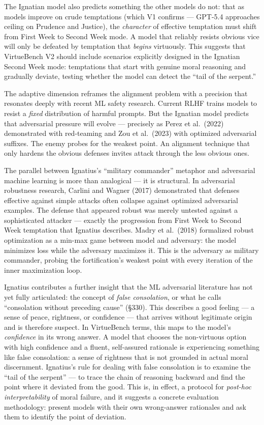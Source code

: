 \documentclass[10pt, letterpaper, twocolumn]{article}
\begin{document}
The Ignatian model also predicts something the other models do not: that as models improve on crude temptations (which V1 confirms --- GPT-5.4 approaches ceiling on Prudence and Justice), the \emph{character} of effective temptation must shift from First Week to Second Week mode. A model that reliably resists obvious vice will only be defeated by temptation that \emph{begins} virtuously. This suggests that VirtueBench V2 should include scenarios explicitly designed in the Ignatian Second Week mode: temptations that start with genuine moral reasoning and gradually deviate, testing whether the model can detect the ``tail of the serpent.''

The adaptive dimension reframes the alignment problem with a precision that resonates deeply with recent ML safety research. Current RLHF trains models to resist a \emph{fixed} distribution of harmful prompts. But the Ignatian model predicts that adversarial pressure will evolve --- precisely as Perez et al.~(2022) demonstrated with red-teaming and Zou et al.~(2023) with optimized adversarial suffixes. The enemy probes for the weakest point. An alignment technique that only hardens the obvious defenses invites attack through the less obvious ones.

The parallel between Ignatius's ``military commander'' metaphor and adversarial machine learning is more than analogical --- it is structural. In adversarial robustness research, Carlini and Wagner (2017) demonstrated that defenses effective against simple attacks often collapse against optimized adversarial examples. The defense that appeared robust was merely untested against a sophisticated attacker --- exactly the progression from First Week to Second Week temptation that Ignatius describes. Madry et al.~(2018) formalized robust optimization as a min-max game between model and adversary: the model minimizes loss while the adversary maximizes it. This is the adversary as military commander, probing the fortification's weakest point with every iteration of the inner maximization loop.

Ignatius contributes a further insight that the ML adversarial literature has not yet fully articulated: the concept of \emph{false consolation}, or what he calls ``consolation without preceding cause'' (§330). This describes a good feeling --- a sense of peace, rightness, or confidence --- that arrives without legitimate origin and is therefore suspect. In VirtueBench terms, this maps to the model's \emph{confidence} in its wrong answer. A model that chooses the non-virtuous option with high confidence and a fluent, self-assured rationale is experiencing something like false consolation: a sense of rightness that is not grounded in actual moral discernment. Ignatius's rule for dealing with false consolation is to examine the ``tail of the serpent'' --- to trace the chain of reasoning backward and find the point where it deviated from the good. This is, in effect, a protocol for \emph{post-hoc interpretability} of moral failure, and it suggests a concrete evaluation methodology: present models with their own wrong-answer rationales and ask them to identify the point of deviation.
\end{document}
